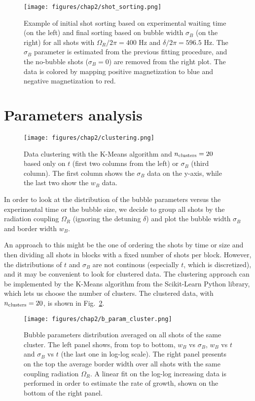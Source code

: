 \begin{figure}[ht!]
    \centering
    \texttt{[image: figures/chap2/shot\_sorting.png]}
    \caption{Example of initial shot sorting based on experimental waiting time (on the left) and final sorting based on bubble width $\sigma_B$ (on the right) for all shots with $\Omega_R/2\pi = 400$ \unit{\hertz} and $\delta/2\pi = 596.5$ \unit{\hertz}. The $\sigma_B$ parameter is estimated from the previous fitting procedure, and the no-bubble shots ($\sigma_B = 0$) are removed from the right plot. The data is colored by mapping positive magnetization to blue and negative magnetization to red.}
    \label{fig:sorting}
\end{figure}

\section{Parameters analysis}
\label{sec:params}
\begin{figure}[ht!]
    \centering
    \texttt{[image: figures/chap2/clustering.png]}
    \caption{Data clustering with the K-Means algorithm and $n_{\rm clusters} = 20$ based only on $t$ (first two columns from the left) or $\sigma_B$ (third column). The first column shows the $\sigma_B$ data on the y-axis, while the last two show the $w_B$ data.}
    \label{fig:clust}
\end{figure} 
In order to look at the distribution of the bubble parameters versus the experimental time or the bubble size, we decide to group all shots by the radiation coupling $\Omega_R$ (ignoring the detuning $\delta$) and plot the bubble width $\sigma_B$ and border width $w_B$. 

An approach to this might be the one of ordering the shots by time or size and then dividing all shots in blocks with a fixed number of shots per block. However, the distributions of $t$ and $\sigma_B$ are not continous (especially $t$, which is discretized), and it may be convenient to look for clustered data. 
The clustering approach can be implemented by the K-Means algorithm from the Scikit-Learn Python library, which lets us choose the number of clusters. The clustered data, with $n_{\rm clusters} = 20$, is shown in Fig.\ \ref{fig:clust}. 
\begin{figure}[ht!]
    \centering
    \texttt{[image: figures/chap2/b\_param\_cluster.png]}
    \caption{Bubble parameters distribution averaged on all shots of the same cluster. The left panel shows, from top to bottom, $w_B$ vs $\sigma_B$, $w_B$ vs $t$ and $\sigma_B$ vs $t$ (the last one in log-log scale). The right panel presents on the top the average border width over all shots with the same coupling radiation $\Omega_R$. A linear fit on the log-log increasing data is performed in order to estimate the rate of growth, shown on the bottom of the right panel.}
    \label{fig:b_param}
\end{figure}

